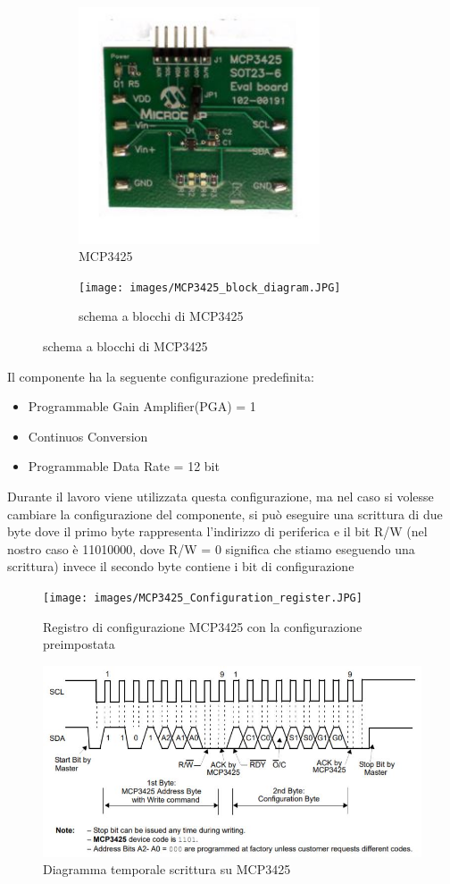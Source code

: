 \documentclass[12pt, a4paper, titlepage, oneside]{book}
\begin{document}
\begin{figure}[h]
\begin{subfigure}{0.5\textwidth}
    \includegraphics[width=0.9\linewidth, height=7cm]{MCP3425.JPG}
    \caption{MCP3425}
    \label{fig:MCP3425}
\end{subfigure}
\begin{subfigure}{0.5\textwidth}
    \texttt{[image: images/MCP3425\_block\_diagram.JPG]}
    \caption{schema a blocchi di MCP3425}
    \label{fig:MCP3425 block diagram}
\end{subfigure}
\end{figure}
Il componente ha la seguente configurazione predefinita:
\begin{itemize}
    \item Programmable Gain Amplifier(PGA) = 1
    \item Continuos Conversion
    \item Programmable Data Rate = 12 bit
\end{itemize}
Durante il lavoro viene utilizzata questa configurazione, ma nel caso si volesse cambiare la configurazione del componente, si può eseguire una scrittura di due byte dove il primo byte rappresenta l'indirizzo di periferica e il bit R/W (nel nostro caso è 11010000, dove R/W = 0 significa che stiamo eseguendo una scrittura) invece il secondo byte contiene i bit di configurazione\newline
\begin{figure}[h]
    \centering
    \texttt{[image: images/MCP3425\_Configuration\_register.JPG]}
    \caption{Registro di configurazione MCP3425 con la configurazione preimpostata}
    \label{fig:CONFIG_REG_MCP3425}
\end{figure}
\newpage
\begin{figure}[h]
    \centering
    \includegraphics[scale = 0.95]{wrtie_configuration_MCP3425.JPG}
    \caption{Diagramma temporale scrittura su MCP3425}
    \label{fig:MCP3425_write_conf}
\end{figure}
\end{document}
